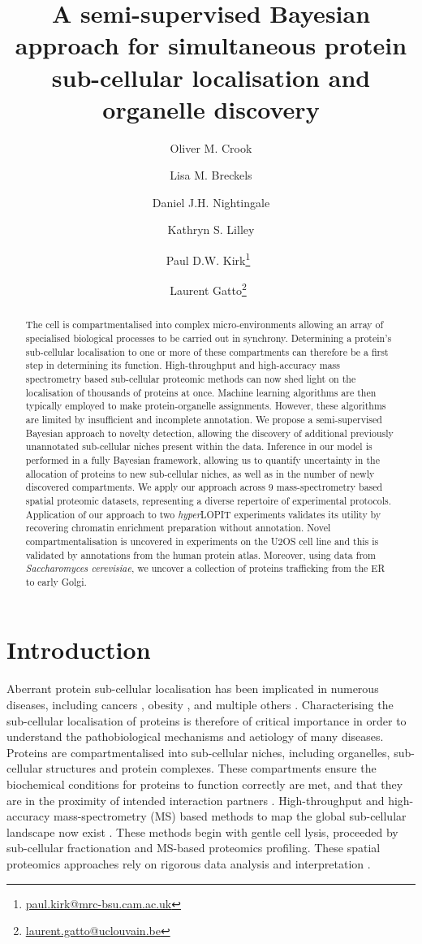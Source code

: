 \documentclass[12pt,english]{article}
\title{A semi-supervised Bayesian approach for simultaneous protein sub-cellular localisation and organelle discovery }
\author[1,2,3]{Oliver M. Crook}
\author[1,2]{Lisa M. Breckels}
\author[2]{Daniel J.H. Nightingale}
\author[2]{Kathryn S. Lilley}
\author[3]{Paul D.W. Kirk\thanks{\url{paul.kirk@mrc-bsu.cam.ac.uk}}~}
\author[4]{Laurent Gatto\thanks{\url{laurent.gatto@uclouvain.be}}~}
\affil[1]{Computational Proteomics Unit, Department of
	Biochemistry, University of Cambridge, Cambridge, UK}
\affil[2]{Cambridge Centre for Proteomics, Department of Biochemistry,
	University of Cambridge, Cambridge, UK}
\affil[3]{MRC Biostatistics Unit, Cambridge Institute for Public
	Health, Cambridge, UK}
\affil[4]{de Duve Institute, UCLouvain, Avenue
	Hippocrate 75, 1200 Brussels, Belgium}
\begin{document}
\maketitle

\begin{abstract}
The cell is compartmentalised into complex micro-environments allowing an array of
specialised biological processes to be carried out in synchrony. Determining a protein's sub-cellular localisation to one or more of these compartments can therefore be a first step in determining its function. High-throughput and high-accuracy mass spectrometry based sub-cellular proteomic methods can now shed light on the localisation of thousands of proteins at once. Machine learning algorithms are then typically employed to make protein-organelle assignments. However, these algorithms are limited by insufficient and incomplete annotation. We propose a semi-supervised Bayesian approach to novelty detection, allowing the discovery of additional previously unannotated sub-cellular niches present within the data. Inference in our model is performed in a fully Bayesian framework, allowing us to quantify uncertainty in the allocation of proteins to new sub-cellular niches, as well as in the number of newly discovered compartments. We apply our approach across $9$ mass-spectrometry based spatial proteomic datasets, representing a diverse repertoire of experimental protocols. Application of our approach to two \textit{hyper}LOPIT experiments validates its utility by recovering chromatin enrichment preparation without annotation. Novel compartmentalisation is uncovered in experiments on the U2OS cell line and this is validated by annotations from the human protein atlas. Moreover, using data from \textit{Saccharomyces cerevisiae}, we uncover a collection of proteins trafficking from the ER to early Golgi.
\end{abstract}
\clearpage
\section{Introduction}
Aberrant protein sub-cellular localisation has been implicated in numerous diseases, including cancers \citep{Kau:2004}, obesity \citep{Siljee:2018}, and multiple others \citep{Laurila:2009}. Characterising the sub-cellular localisation of proteins is therefore of critical importance in order to understand the pathobiological mechanisms and aetiology of many diseases. Proteins are compartmentalised into sub-cellular niches, including organelles, sub-cellular structures and protein complexes. These compartments ensure the biochemical conditions for proteins to function correctly are met, and that they are in the proximity of intended interaction partners \citep{Gibson:2009}. High-throughput and high-accuracy mass-spectrometry (MS) based methods to map the global sub-cellular landscape now exist \citep{hyper, Mulvey:2017, DC:2018}. These methods begin with gentle cell lysis, proceeded by sub-cellular fractionation and MS-based proteomics profiling. These spatial proteomics approaches rely on rigorous data analysis and interpretation \citep{Gatto:2010, Gatto:2014b}.
\end{document}
